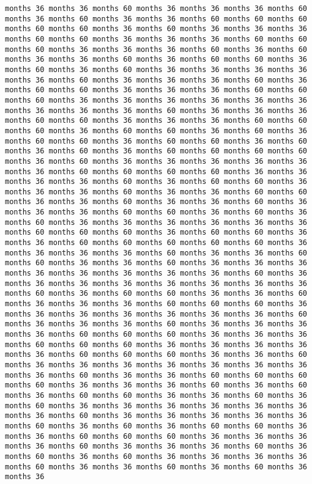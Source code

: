 \documentclass[11pt]{article}
\begin{document}
\begin{Verbatim}[commandchars=\\\{\}, frame=single, framerule=2mm, rulecolor=\color{outerrorbackground}]
months 36 months 36 months 60 months 36 months 36 months 36 months 60 months 36 months 60 months 36 months 36 months 60 months 60 months 60 months 60 months 60 months 36 months 60 months 36 months 36 months 36 months 60 months 60 months 36 months 36 months 36 months 60 months 60 months 60 months 36 months 36 months 36 months 60 months 36 months 60 months 36 months 36 months 60 months 36 months 60 months 60 months 36 months 60 months 36 months 60 months 36 months 36 months 36 months 36 months 36 months 60 months 36 months 36 months 36 months 60 months 36 months 60 months 60 months 36 months 36 months 36 months 60 months 60 months 60 months 36 months 36 months 36 months 36 months 36 months 36 months 36 months 36 months 36 months 60 months 36 months 36 months 36 months 60 months 60 months 36 months 36 months 36 months 60 months 60 months 60 months 36 months 60 months 60 months 36 months 60 months 36 months 60 months 60 months 36 months 60 months 60 months 36 months 60 months 36 months 60 months 36 months 60 months 60 months 60 months 60 months 36 months 60 months 36 months 36 months 36 months 36 months 36 months 36 months 60 months 60 months 60 months 60 months 36 months 36 months 36 months 36 months 60 months 36 months 60 months 60 months 36 months 36 months 36 months 60 months 36 months 36 months 60 months 60 months 36 months 36 months 60 months 36 months 36 months 60 months 36 months 36 months 36 months 60 months 60 months 36 months 60 months 36 months 60 months 36 months 36 months 36 months 36 months 36 months 36 months 60 months 60 months 60 months 36 months 60 months 60 months 36 months 36 months 60 months 60 months 60 months 60 months 60 months 36 months 36 months 36 months 36 months 60 months 36 months 36 months 60 months 60 months 36 months 36 months 60 months 36 months 36 months 36 months 36 months 36 months 36 months 36 months 36 months 60 months 36 months 36 months 36 months 36 months 36 months 36 months 36 months 36 months 60 months 36 months 60 months 60 months 36 months 36 months 60 months 36 months 36 months 36 months 60 months 60 months 60 months 36 months 36 months 36 months 36 months 36 months 36 months 36 months 60 months 36 months 36 months 36 months 60 months 36 months 36 months 36 months 36 months 60 months 60 months 60 months 36 months 36 months 36 months 60 months 60 months 60 months 36 months 36 months 36 months 36 months 36 months 60 months 60 months 60 months 36 months 36 months 60 months 36 months 36 months 36 months 36 months 36 months 36 months 36 months 36 months 60 months 36 months 36 months 60 months 60 months 60 months 60 months 36 months 36 months 36 months 60 months 36 months 60 months 36 months 60 months 60 months 36 months 36 months 60 months 36 months 60 months 36 months 36 months 36 months 36 months 36 months 36 months 36 months 60 months 36 months 36 months 36 months 36 months 36 months 60 months 36 months 60 months 36 months 60 months 60 months 36 months 36 months 60 months 60 months 60 months 36 months 36 months 36 months 36 months 60 months 36 months 36 months 36 months 60 months 36 months 60 months 36 months 60 months 36 months 36 months 36 months 36 months 60 months 36 months 36 months 60 months 36 months 60 months 36 months 36 
\end{Verbatim}
\end{document}
